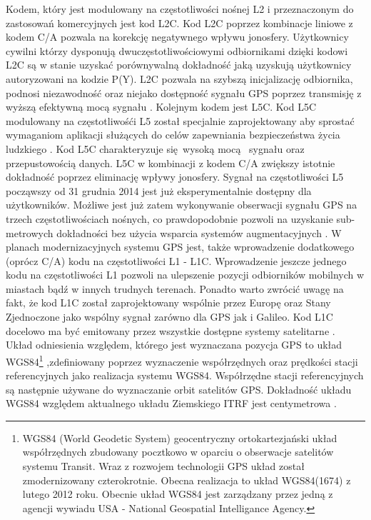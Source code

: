 Kodem, który jest modulowany na częstotliwości nośnej L2 i przeznaczonym do zastosowań komercyjnych jest kod L2C. Kod L2C poprzez kombinacje liniowe z kodem C/A pozwala 
na korekcję negatywnego wpływu jonosfery. Użytkownicy cywilni którzy dysponują dwuczęstotliwościowymi odbiornikami dzięki kodowi L2C są w stanie uzyskać porównywalną
dokładność jaką uzyskują użytkownicy autoryzowani na kodzie P(Y). L2C pozwala na szybszą inicjalizację odbiornika, podnosi niezawodność oraz niejako dostępność sygnału 
GPS poprzez transmisję z wyższą efektywną mocą sygnału \cite[]{GPS_GOV}. Kolejnym kodem jest L5C. Kod L5C modulowany na częstotliwośći L5 został specjalnie zaprojektowany 
aby sprostać wymaganiom aplikacji służących do celów zapewniania bezpieczeństwa życia ludzkiego \cite[][strona 335]{hofmann_gnss}. Kod L5C charakteryzuje się wysoką mocą 
sygnału oraz przepustowością danych. L5C w kombinacji z kodem C/A zwiększy istotnie dokładność poprzez eliminację wpływy jonosfery. Sygnał na częstotliwości L5 
począwszy od 31 grudnia 2014 jest już eksperymentalnie dostępny dla użytkowników. Możliwe jest już zatem wykonywanie obserwacji sygnału GPS na trzech częstotliwościach nośnych,
co prawdopodobnie pozwoli na uzyskanie sub-metrowych dokładności bez użycia wsparcia systemów augmentacyjnych \cite[]{GPS_GOV}. W planach modernizacyjnych systemu GPS jest,
także wprowadzenie dodatkowego (oprócz C/A) kodu na częstotliwości L1 - L1C. Wprowadzenie jeszcze jednego kodu na częstotliwości L1 pozwoli na ulepszenie pozycji 
odbiorników mobilnych w miastach bądź w innych trudnych terenach. Ponadto warto zwrócić uwagę na fakt, że kod L1C został zaprojektowany wspólnie przez Europę oraz 
Stany Zjednoczone jako wspólny sygnał zarówno dla GPS jak i Galileo. Kod L1C docelowo ma być emitowany przez wszystkie dostępne systemy satelitarne \cite[]{GPS_GOV}.\\
\indent Układ odniesienia względem, którego jest wyznaczana pozycja GPS to układ WGS84\footnote{WGS84 (World Geodetic System) geocentryczny ortokartezjański układ współrzędnych
zbudowany pocztkowo w oparciu o obserwacje satelitów systemu Transit. Wraz z rozwojem technologii GPS układ został zmodernizowany czterokrotnie.
Obecna realizacja to układ WGS84(1674) z lutego 2012 roku. Obecnie układ WGS84 jest zarządzany przez jedną z agencji wywiadu USA - National Geospatial Intelligance Agency.}
,zdefiniowany poprzez wyznaczenie współrzędnych oraz prędkości stacji referencyjnych jako realizacja systemu WGS84. Współrzędne stacji referencyjnych są następnie 
używane do wyznaczanie orbit satelitów GPS. Dokładność układu WGS84 względem aktualnego układu Ziemskiego ITRF jest centymetrowa \cite[][strona 51]{donnelly}.
